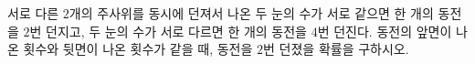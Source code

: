 서로 다른 $2$개의 주사위를 동시에 던져서 나온 두 눈의 수가 서로 같으면 한 개의 동전을 $2$번 던지고, 두 눈의 수가 서로 다르면 한 개의 동전을 $4$번 던진다. 동전의 앞면이 나온 횟수와 뒷면이 나온 횟수가 같을 때, 동전을 $2$번 던졌을 확률을 구하시오.
